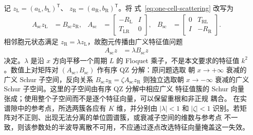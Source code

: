 记 $z_{\mathrm L}=(a_{\mathrm L},b_{\mathrm L})^{\mathsf T}$、
$z_{\mathrm R}=(a_{\mathrm R},b_{\mathrm R})^{\mathsf T}$。将
式~\eqref{eq:one-cell-scattering} 改写为
\begin{align}
  A_{\mathrm{sc}}z_{\mathrm L}&=B_{\mathrm{sc}}z_{\mathrm R},
  &
  A_{\mathrm{sc}}&=
  \begin{bmatrix}
    -R_{\mathrm L}&I\\ T_{\mathrm{LR}}&0
  \end{bmatrix},
  &
  B_{\mathrm{sc}}&=
  \begin{bmatrix}
    0&T_{\mathrm{RL}}\\ I&-R_{\mathrm R}
  \end{bmatrix}.
  \label{eq:one-cell-matrix-pair}
\end{align}
相邻胞元状态满足 $z_{\mathrm R}=\lambda z_{\mathrm L}$，故胞元传播由广义特征值问题
\begin{align}
  A_{\mathrm{sc}}z&=\lambda B_{\mathrm{sc}}z
  \label{eq:one-cell-generalized-eigenproblem}
\end{align}
决定。$\lambda$ 是沿 $x$ 方向平移一个周期 $L$ 的 Floquet 乘子，不是本文要求的特征值
$k^2$。数值上对矩阵对 $(A_{\mathrm{sc}},B_{\mathrm{sc}})$ 作有序 QZ 分解：原问题选取
朝 $x\to+\infty$ 衰减的广义 Schur 子空间，反向关系
$B_{\mathrm{sc}}z_{\mathrm R}=\zeta A_{\mathrm{sc}}z_{\mathrm R}$ 则独立选取朝
$x\to-\infty$ 衰减的广义 Schur 子空间。这里的子空间由有序 QZ 分解中相应广义
特征值簇的 Schur 向量张成；使用整个子空间而不是逐个特征向量，可以保留重根和非正规
耦合。
在实谱隙中的参考点，所选两簇各应有 $K$ 维，并分别由 $|\lambda|<1$ 和
$|\zeta|<1$ 识别。若矩阵对不正则、出现无法分离的单位圆谱簇，或衰减子空间的维数与参考点
不一致，则该参数处的半波导离散不可用，不应通过逐点改选特征向量掩盖这一失效。

